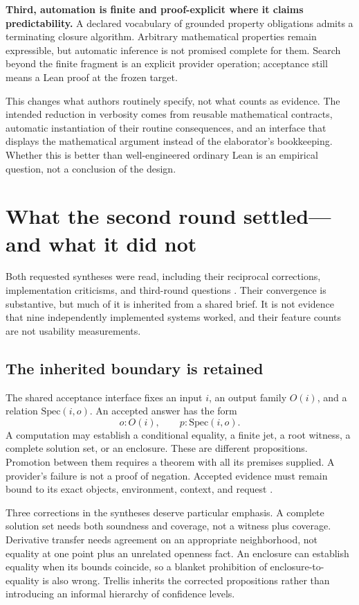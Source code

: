 \documentclass[11pt,a4paper]{article}
\theoremstyle{definition}
\theoremstyle{remark}
\begin{document}
\textbf{Third, automation is finite and proof-explicit where it claims predictability.} A declared vocabulary of grounded property obligations admits a terminating closure algorithm. Arbitrary mathematical properties remain expressible, but automatic inference is not promised complete for them. Search beyond the finite fragment is an explicit provider operation; acceptance still means a Lean proof at the frozen target.

This changes what authors routinely specify, not what counts as evidence. The intended reduction in verbosity comes from reusable mathematical contracts, automatic instantiation of their routine consequences, and an interface that displays the mathematical argument instead of the elaborator's bookkeeping. Whether this is better than well-engineered ordinary Lean is an empirical question, not a conclusion of the design.

\section{What the second round settled---and what it did not}
\label{sec:roundtwo}

Both requested syntheses were read, including their reciprocal corrections, implementation criticisms, and third-round questions \cite{synA,synB}. Their convergence is substantive, but much of it is inherited from a shared brief. It is not evidence that nine independently implemented systems worked, and their feature counts are not usability measurements.

\subsection{The inherited boundary is retained}
The shared acceptance interface fixes an input $i$, an output family $O(i)$, and a relation $\mathrm{Spec}(i,o)$. An accepted answer has the form
\[
 o:O(i),\qquad p:\mathrm{Spec}(i,o).
\]
A computation may establish a conditional equality, a finite jet, a root witness, a complete solution set, or an enclosure. These are different propositions. Promotion between them requires a theorem with all its premises supplied. A provider's failure is not a proof of negation. Accepted evidence must remain bound to its exact objects, environment, context, and request \cite{synA,synB}.

Three corrections in the syntheses deserve particular emphasis. A complete solution set needs both soundness and coverage, not a witness plus coverage. Derivative transfer needs agreement on an appropriate neighborhood, not equality at one point plus an unrelated openness fact. An enclosure can establish equality when its bounds coincide, so a blanket prohibition of enclosure-to-equality is also wrong. Trellis inherits the corrected propositions rather than introducing an informal hierarchy of confidence levels.
\end{document}
